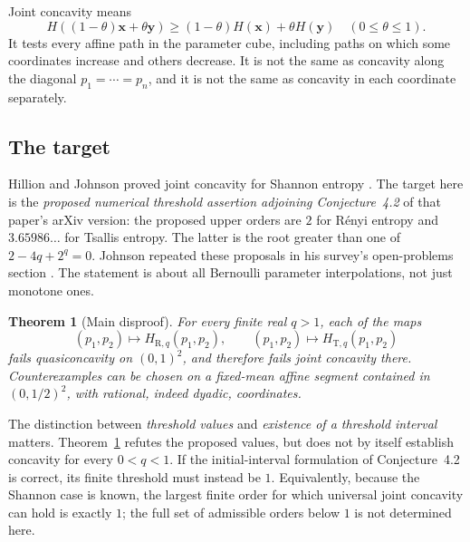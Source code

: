 \documentclass[11pt]{article}
\numberwithin{equation}{section}
\newtheorem{theorem}{Theorem}[section]
\theoremstyle{definition}
\theoremstyle{remark}
\begin{document}
Joint concavity means
\begin{equation}
 H((1-\theta)\boldsymbol x+\theta\boldsymbol y)
 \geq (1-\theta)H(\boldsymbol x)+\theta H(\boldsymbol y)
 \quad(0\leq\theta\leq1).\label{eq:jensen}
\end{equation}
It tests every affine path in the parameter cube, including paths on which
some coordinates increase and others decrease. It is not the same as
concavity along the diagonal $p_1=\cdots=p_n$, and it is not the same as
concavity in each coordinate separately.

\subsection{The target}
Hillion and Johnson proved joint concavity for Shannon entropy
\cite[Theorem~1.2]{HJ2017}. The target here is the \emph{proposed numerical
threshold assertion adjoining Conjecture~4.2} of that paper's arXiv version:
the proposed upper orders are $2$ for R\'enyi entropy and $3.65986\ldots$ for
Tsallis entropy. The latter is the root greater than one of
$2-4q+2^q=0$. Johnson repeated these proposals in his survey's open-problems
section \cite[Section~8, item~5]{J2017}. The statement is about all Bernoulli
parameter interpolations, not just monotone ones.

\begin{theorem}[Main disproof]\label{thm:main}
For every finite real $q>1$, each of the maps
\[
 (p_1,p_2)\longmapsto H_{\mathrm R,q}(p_1,p_2),\qquad
 (p_1,p_2)\longmapsto H_{\mathrm T,q}(p_1,p_2)
\]
fails quasiconcavity on $(0,1)^2$, and therefore fails joint concavity there.
Counterexamples can be chosen on a fixed-mean affine segment contained in
$(0,1/2)^2$, with rational, indeed dyadic, coordinates.
\end{theorem}

The distinction between \emph{threshold values} and \emph{existence of a
threshold interval} matters. Theorem~\ref{thm:main} refutes the proposed
values, but does not by itself establish concavity for every $0<q<1$.
If the initial-interval formulation of Conjecture~4.2 is correct, its finite
threshold must instead be $1$. Equivalently, because the Shannon case is
known, the largest finite order for which universal joint concavity can hold
is exactly $1$; the full set of admissible orders below $1$ is not determined
here.

\end{document}
